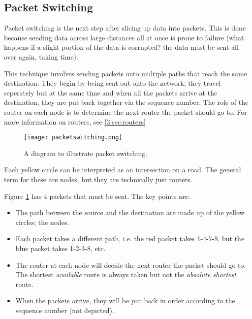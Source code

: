\documentclass[../main.tex]{subfiles}
\begin{document}
\subsection{Packet Switching}

Packet switching is the next step after slicing up data into packets. This is done because sending data across large distances all at once is prone to failure (what happens if a slight portion of the data is corrupted? the data must be sent all over again, taking time). 

This technique involves sending packets onto multiple paths that reach the same destination. They begin by being sent out onto the network; they travel seperately but at the same time and when all the packets arrive at the destination, they are put back together via the sequence number. The role of the router on each node is to determine the next router the packet should go to. For more information on routers, see \ref{3:sec:routers} 

\begin{figure}[h]
    \centering
    \texttt{[image: packetswitching.png]}
    \caption{A diagram to illustrate packet switching.}
    \label{fig:packetswitching}
\end{figure}

Each yellow circle can be interpreted as an intersection on a road. The general term for these are nodes, but they are technically just routers.

Figure \ref{fig:packetswitching} has 4 packets that must be sent. The key points are:

\begin{itemize}
    \item The path between the source and the destination are made up of the yellow circles; the nodes.
    \item Each packet takes a different path, i.e. the red packet takes 1-4-7-8, but the blue packet takes 1-2-3-8, etc.
    \item The router at each node will decide the next router the packet should go to. The shortest \emph{available} route is always taken but not the \emph{absolute shortest} route.
    \item When the packets arrive, they will be put back in order according to the sequence number (not depicted).
\end{itemize}
\end{document}
